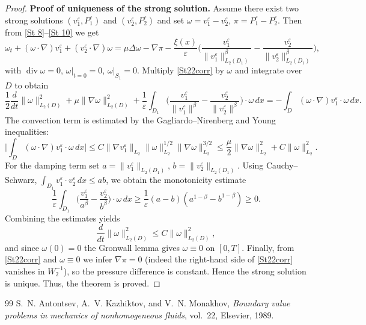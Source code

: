 \documentclass[10pt,a4paper]{amsart}
\begin{document}
\begin{proof}
\textbf{Proof of uniqueness of the strong solution.} Assume there exist two strong solutions $(v_1^\varepsilon,P_1^\varepsilon)$ and $(v_2^\varepsilon,P_2^\varepsilon)$ and set
$\omega=v_1^\varepsilon-v_2^\varepsilon$, $\pi=P_1^\varepsilon-P_2^\varepsilon$. Then from \eqref{St 8}--\eqref{St 10} we get
\begin{equation}\label{St22corr}
	\omega_t+(\omega\cdot\nabla)v_1^\varepsilon+(v_2^\varepsilon\cdot\nabla)\omega=\mu\Delta\omega-\nabla\pi
	-\frac{\xi(x)}{\varepsilon}\Big(\frac{v_1^\varepsilon}{\|v_1^\varepsilon\|_{L_2(D_1)}^\beta}-\frac{v_2^\varepsilon}{\|v_2^\varepsilon\|_{L_2(D_1)}^\beta}\Big),
\end{equation}
with $\operatorname{div}\omega=0$, $\omega|_{t=0}=0$, $\omega|_{S_1}=0$. Multiply \eqref{St22corr} by $\omega$ and integrate over $D$ to obtain
\[
\frac12\frac{d}{dt}\|\omega\|_{L_2(D)}^2+\mu\|\nabla\omega\|_{L_2(D)}^2
+\frac{1}{\varepsilon}\int_{D_1}\Big(\frac{v_1^\varepsilon}{\|v_1^\varepsilon\|^\beta}-\frac{v_2^\varepsilon}{\|v_2^\varepsilon\|^\beta}\Big)\!\cdot\omega\,dx
=-\int_D(\omega\cdot\nabla)v_1^\varepsilon\cdot\omega\,dx.
\]
The convection term is estimated by the Gagliardo--Nirenberg and Young inequalities:
\[
\Big|\int_D(\omega\cdot\nabla)v_1^\varepsilon\cdot\omega\,dx\Big|
\le C\|\nabla v_1^\varepsilon\|_{L_2}\|\omega\|_{L_2}^{1/2}\|\nabla\omega\|_{L_2}^{3/2}
\le\frac\mu2\|\nabla\omega\|_{L_2}^2 + C\|\omega\|_{L_2}^2.
\]
For the damping term set $a=\|v_1^\varepsilon\|_{L_2(D_1)}$, $b=\|v_2^\varepsilon\|_{L_2(D_1)}$. Using Cauchy--Schwarz,
$\int_{D_1}v_1^\varepsilon\cdot v_2^\varepsilon\,dx\le ab$, we obtain the monotonicity estimate
\[
\frac{1}{\varepsilon}\int_{D_1}\Big(\frac{v_1^\varepsilon}{a^\beta}-\frac{v_2^\varepsilon}{b^\beta}\Big)\cdot\omega\,dx
\ge\frac{1}{\varepsilon}(a-b)(a^{1-\beta}-b^{1-\beta})\ge0.
\]
Combining the estimates yields
\[
\frac{d}{dt}\|\omega\|_{L_2(D)}^2 \le C\|\omega\|_{L_2(D)}^2,
\]
and since $\omega(0)=0$ the Gronwall lemma gives $\omega\equiv0$ on $[0,T]$. Finally, from \eqref{St22corr} and $\omega\equiv0$ we infer $\nabla\pi=0$ (indeed the right-hand side of \eqref{St22corr} vanishes in $W^{-1}_2$), so the pressure difference is constant. Hence the strong solution is unique.
   Thus, the theorem is proved.
\end{proof}

\begin{thebibliography}{99}
 {\sc S.~N. Antontsev, A.~V. Kazhiktov, and V.~N. Monakhov}, {\em Boundary value problems in mechanics of nonhomogeneous fluids}, vol.~22, Elsevier, 1989.
\end{thebibliography}
\end{document}
